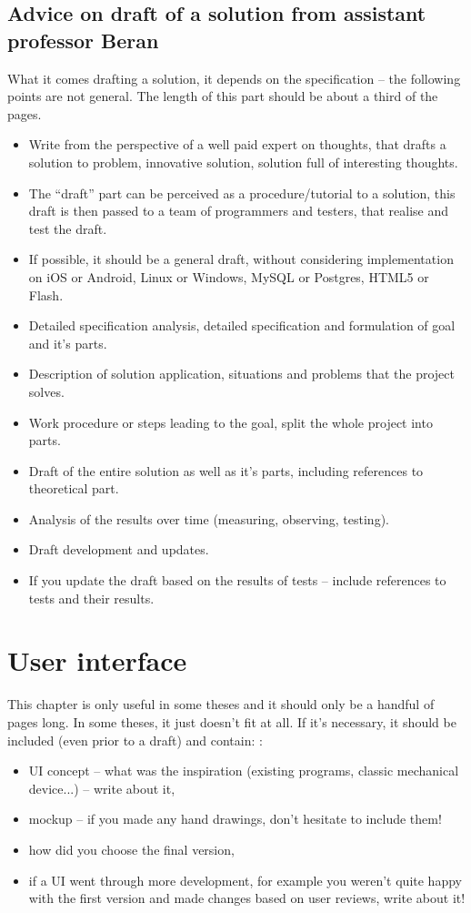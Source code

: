 \subsection*{Advice on draft of a solution from assistant professor Beran}

What it comes drafting a solution, it depends on the specification -- the following points are not general. The length of this part should be about a third of the pages.
\begin{itemize}
  \item{Write from the perspective of a well paid expert on thoughts, that drafts a solution to problem, innovative solution, solution full of interesting thoughts.}
  \item{The ``draft'' part can be perceived as a procedure/tutorial to a solution, this draft is then passed to a team of programmers and testers, that realise and test the draft.}
  \item{If possible, it should be a general draft, without considering implementation on iOS or Android, Linux or Windows, MySQL or Postgres, HTML5 or Flash.}
  \item{Detailed specification analysis, detailed specification and formulation of goal and it's parts.}
  \item{Description of solution application, situations and problems that the project solves.}
  \item{Work procedure or steps leading to the goal, split the whole project into parts.}
  \item{Draft of the entire solution as well as it's parts, including references to theoretical part.}
  \item{Analysis of the results over time (measuring, observing, testing).}
  \item{Draft development and updates.}
  \item{If you update the draft based on the results of tests -- include references to tests and their results.}
\end{itemize}

\section{User interface}

This chapter is only useful in some theses and it should only be a handful of pages long. In some theses, it just doesn't fit at all. If it's necessary, it should be included (even prior to a draft) and contain: \cite{Cernocky}:
\begin{itemize}
  \item{UI concept -- what was the inspiration (existing programs, classic mechanical device...) -- write about it,}
  \item{mockup -- if you made any hand drawings, don't hesitate to include them!}
  \item{how did you choose the final version,}
  \item{if a UI went through more development, for example you weren't quite happy with the first version and made changes based on user reviews, write about it!}
\end{itemize}


